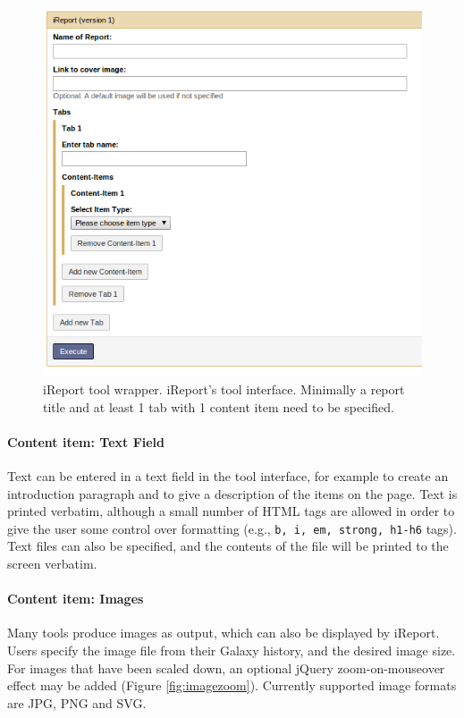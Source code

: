 \begin{figure}[h!]
    \centering
    \includegraphics[scale=0.5]{chapters/images/iReport/Hiltemann_wrapper.jpg}
    \caption{iReport tool wrapper. iReport's tool interface. Minimally a report title and at least 1 tab with 1 content item need to be specified.}
    \label{fig:wrapper}
\end{figure}

\paragraph*{Content item: Text Field}
Text can be entered in a text field in the tool interface, for example to create an introduction paragraph and to give a description of the items on the page. Text is printed verbatim, although a small number of HTML tags are allowed in order to give the user some control over formatting (e.g., \verb+b, i, em, strong, h1-h6+ tags). Text files can also be specified, and the contents of the file will be printed to the screen verbatim.

\paragraph*{Content item: Images}
Many tools produce images as output, which can also be displayed by iReport. Users specify the image file from their Galaxy history, and the desired image size. For images that have been scaled down, an optional jQuery zoom-on-mouseover effect may  be added (Figure \ref{fig:imagezoom})\cite{url-jqueryzoom}. Currently supported image formats are JPG, PNG and SVG.

